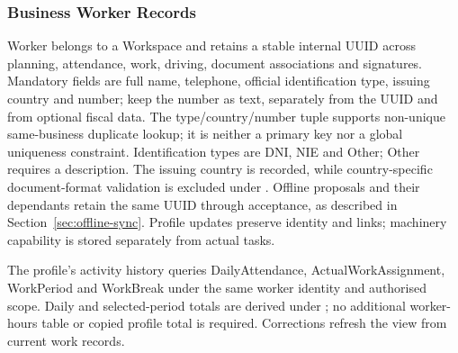 \subsubsection{Business Worker Records}
\label{sec:conceptual-workers}
Worker belongs to a Workspace and retains a stable internal UUID across planning,
attendance, work, driving, document associations and signatures. Mandatory fields
are full name, telephone, official identification type, issuing country and number;
keep the number as text, separately from the UUID and from optional fiscal data.
The type/country/number tuple supports non-unique same-business duplicate lookup;
it is neither a primary key nor a global uniqueness constraint. Identification types are DNI, NIE and Other; Other requires a description. The issuing country is recorded, while country-specific document-format validation is excluded under . Offline proposals and their
dependants retain the same UUID through acceptance, as described in
Section~\ref{sec:offline-sync}. Profile updates preserve identity and links;
machinery capability is stored separately from actual tasks.

The profile's activity history queries DailyAttendance, ActualWorkAssignment,
WorkPeriod and WorkBreak under the same worker identity and authorised scope.
Daily and selected-period totals are derived under ; no
additional worker-hours table or copied profile total is required. Corrections
refresh the view from current work records.
